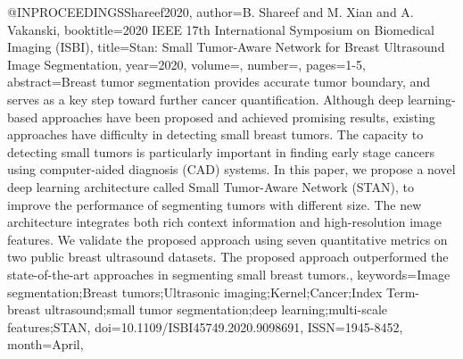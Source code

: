 @INPROCEEDINGS{Shareef2020,
  author={B. {Shareef} and M. {Xian} and A. {Vakanski}},
  booktitle={2020 IEEE 17th International Symposium on Biomedical Imaging (ISBI)}, 
  title={Stan: Small Tumor-Aware Network for Breast Ultrasound Image Segmentation}, 
  year={2020},
  volume={},
  number={},
  pages={1-5},
  abstract={Breast tumor segmentation provides accurate tumor boundary, and serves as a key step toward further cancer quantification. Although deep learning-based approaches have been proposed and achieved promising results, existing approaches have difficulty in detecting small breast tumors. The capacity to detecting small tumors is particularly important in finding early stage cancers using computer-aided diagnosis (CAD) systems. In this paper, we propose a novel deep learning architecture called Small Tumor-Aware Network (STAN), to improve the performance of segmenting tumors with different size. The new architecture integrates both rich context information and high-resolution image features. We validate the proposed approach using seven quantitative metrics on two public breast ultrasound datasets. The proposed approach outperformed the state-of-the-art approaches in segmenting small breast tumors.},
  keywords={Image segmentation;Breast tumors;Ultrasonic imaging;Kernel;Cancer;Index Term- breast ultrasound;small tumor segmentation;deep learning;multi-scale features;STAN},
  doi={10.1109/ISBI45749.2020.9098691},
  ISSN={1945-8452},
  month={April},}
